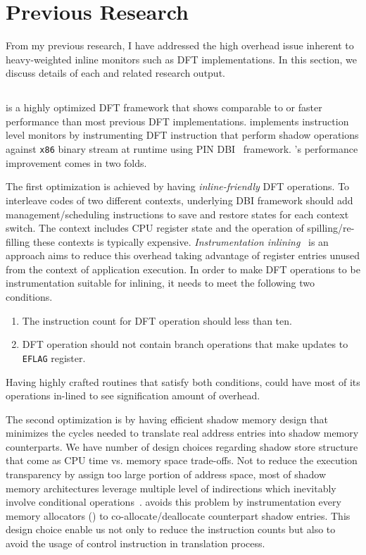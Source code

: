\section{Previous Research}
\label{sec:previous}

From my previous research, I have addressed the high overhead issue inherent to
heavy-weighted inline monitors such as DFT implementations. In this section, we
discuss details of each and related research output.

\subsection{\libdft}

\libdft is a highly optimized DFT framework that shows comparable to or faster
performance than most previous DFT implementations. \libdft implements
instruction level monitors by instrumenting DFT instruction that perform shadow
operations against {\tt x86} binary stream at runtime using PIN
DBI~\cite{pin:pldi2005} framework.
%
\libdft's performance improvement comes in two folds. 

The first optimization is achieved by having {\it inline-friendly} DFT
operations. To interleave codes of two different contexts, underlying DBI
framework should add management/scheduling instructions to save and restore
states for each context switch. The context includes CPU register state  and
the operation of spilling/re-filling these contexts is typically expensive.
{\it Instrumentation inlining}~\cite{inlining:wbia2006} is an approach aims to
reduce this overhead taking advantage of register entries unused from the
context of application execution. In order to make DFT operations to be
instrumentation suitable for inlining, it needs to meet the following two
conditions.
%
\begin{enumerate} \item The instruction count for DFT operation should less
than ten.  \item DFT operation should not contain branch operations that make
updates to {\tt EFLAG} register.  \end{enumerate} 
%
Having highly crafted routines that satisfy both conditions, \libdft could have
most of its operations in-lined to see signification amount of overhead.

The second optimization is by having efficient shadow memory design that
minimizes the cycles needed to translate real address entries into shadow
memory counterparts. We have number of design choices regarding shadow store
structure that come as CPU time vs. memory space trade-offs. Not to reduce the
execution transparency by assign too large portion of address space, most of
shadow memory architectures leverage multiple level of indirections which
inevitably involve conditional operations~\cite{}. \libdft avoids this problem
by instrumentation every memory allocators ()
to co-allocate/deallocate counterpart shadow entries. This design choice enable
us not only to reduce the instruction counts but also to avoid the usage of
control instruction in translation process.

